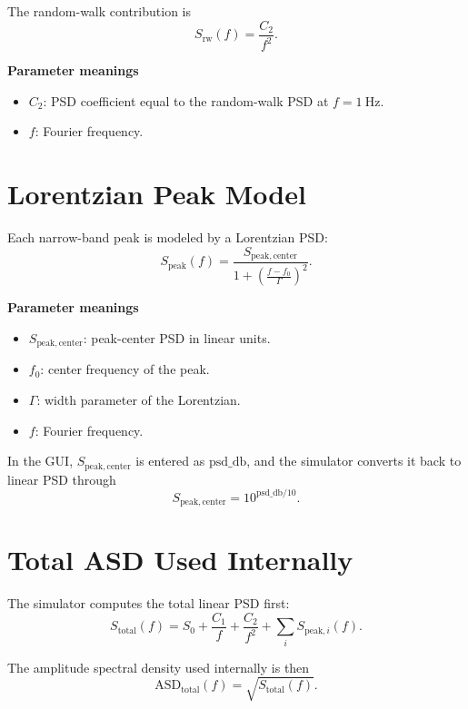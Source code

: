 \documentclass[11pt,a4paper]{article}
\begin{document}
The random-walk contribution is
\begin{equation}
  S_{\mathrm{rw}}(f) = \frac{C_2}{f^2}.
\end{equation}

\textbf{Parameter meanings}
\begin{itemize}[leftmargin=1.5em]
  \item $C_2$: PSD coefficient equal to the random-walk PSD at $f=1~\mathrm{Hz}$.
  \item $f$: Fourier frequency.
\end{itemize}

\section{Lorentzian Peak Model}

Each narrow-band peak is modeled by a Lorentzian PSD:
\begin{equation}
  S_{\mathrm{peak}}(f) =
  \frac{S_{\mathrm{peak,center}}}
  {1 + \left(\frac{f-f_0}{\Gamma}\right)^2}.
\end{equation}

\textbf{Parameter meanings}
\begin{itemize}[leftmargin=1.5em]
  \item $S_{\mathrm{peak,center}}$: peak-center PSD in linear units.
  \item $f_0$: center frequency of the peak.
  \item $\Gamma$: width parameter of the Lorentzian.
  \item $f$: Fourier frequency.
\end{itemize}

In the GUI, $S_{\mathrm{peak,center}}$ is entered as $\mathrm{psd\_db}$, and the simulator converts it back to linear PSD through
\begin{equation}
  S_{\mathrm{peak,center}} = 10^{\mathrm{psd\_db}/10}.
\end{equation}

\section{Total ASD Used Internally}

The simulator computes the total linear PSD first:
\begin{equation}
  S_{\mathrm{total}}(f) =
  S_0 + \frac{C_1}{f} + \frac{C_2}{f^2} + \sum_i S_{\mathrm{peak},i}(f).
\end{equation}

The amplitude spectral density used internally is then
\begin{equation}
  \mathrm{ASD}_{\mathrm{total}}(f) = \sqrt{S_{\mathrm{total}}(f)}.
\end{equation}
\end{document}
